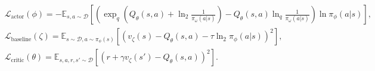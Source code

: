 \documentclass{article}
\newcommand{\AdaBracket}[1]{\left(#1\right)}
\newcommand{\AdaRectBracket}[1]{\left[#1\right]}
\newcommand{\expectation}[2]{\mathbb{E}_{#1}\AdaRectBracket{#2}}
\newcommand{\logq}[1]{\ln_{q}\!#1}
\newcommand{\datasetPolicy}{\pi_{\mathcal{D}}}
\begin{document}
\begin{align}
    &\mathcal{L}_\text{actor}(\phi) = -\expectation{s,a \sim \mathcal{D}}{ \AdaBracket{ \exp_q\AdaBracket{Q_{\theta}(s,a) + \ln_2\frac{1}{\pi_{\omega}(a|s)}} -  Q_{\theta}(s,a)  \logq{\frac{1}{\pi_{\omega}(a|s)}} } \ln\pi_{\phi}(a|s) }, \\
    & \mathcal{L}_\text{baseline}(\zeta) = \expectation{s\sim\mathcal{D}, a\sim \pi_{\phi}(s)}{\AdaBracket{ v_{\zeta}(s) - Q_{\theta}(s,a) - \tau\ln_2\pi_{\phi}(a|s)}^2},\\
    & \mathcal{L}_\text{critic}(\theta) = \expectation{s,a,r,s' \sim \mathcal{D}}{\AdaBracket{r + \gamma v_{\zeta}(s') - Q_{\theta}(s,a)}^2 }.
\end{align}


\clearpage



\end{document}
